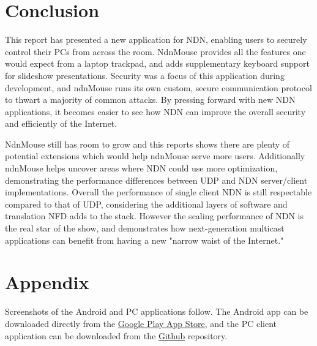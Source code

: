 \documentclass{sig-alternate}
\renewcommand\_{\textunderscore\allowbreak}  %
\begin{document}
\section{Conclusion}
This report has presented a new application for NDN, enabling users to securely control their PCs from across the room. NdnMouse provides all the features one would expect from a laptop trackpad, and adds supplementary keyboard support for slideshow presentations. Security was a focus of this application during development, and ndnMouse runs its own custom, secure communication protocol to thwart a majority of common attacks. By pressing forward with new NDN applications, it becomes easier to see how NDN can improve the overall security and efficiently of the Internet. 

NdnMouse still has room to grow and this reports shows there are plenty of potential extensions which would help ndnMouse serve more users. Additionally ndnMouse helps uncover areas where NDN could use more optimization, demonstrating the performance differences between UDP and NDN server/client implementations. Overall the performance of single client NDN is still respectable compared to that of UDP, considering the additional layers of software and translation NFD adds to the stack. However the scaling performance of NDN is the real star of the show, and demonstrates how next-generation multicast applications can benefit from having a new "narrow waist of the Internet."



\section{Appendix}
Screenshots of the Android and PC applications follow. The Android app can be downloaded directly from the \href{https://play.google.com/store/apps/details?id=edu.ucla.cs.ndnmouse}{Google Play App Store}, and the PC client application can be downloaded from the \href{https://github.com/wminner/ndnMouse/tree/master/pc_client}{Github} repository.
\end{document}

